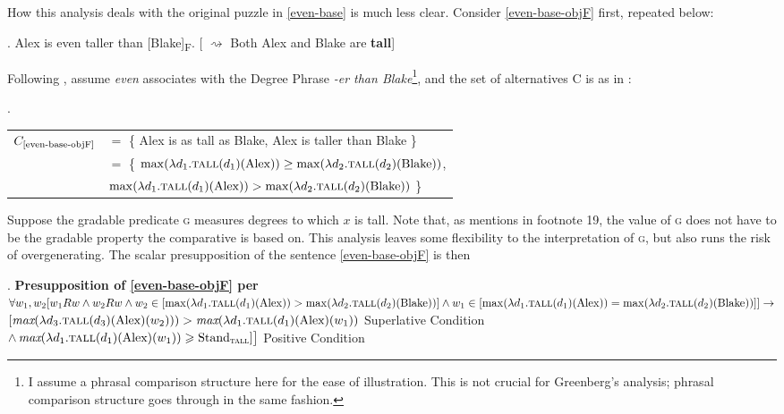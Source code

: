 \documentclass[12pt,letterpaper]{scrartcl}
\makeatletter
\newif\if@repeated\@repeatedfalse
\newcounter{savedExNo}
\newcommand{\exr}[1]{%
\@repeatedtrue
\setcounter{savedExNo}{\value{ExNo}}
\def\tmp@ref{#1}
\ex.}
\newcommand{\alignright}{\hspace*{\fill}}
\newcommand{\infer}{$\rightsquigarrow$ }
\makeatother
\begin{document}
How this analysis deals with the original puzzle in \ref{even-base} is much less clear. Consider \ref{even-base-objF} first, repeated below:

\exr{even-base-objF} Alex is even taller than [Blake]\textsubscript{F}.  %
\alignright [ \infer Both Alex and Blake are \textbf{tall}]

Following \cite{greenberg_revised_2018}, assume \textit{even} associates with the Degree Phrase \textit{-er than Blake}\footnote{I assume a phrasal comparison structure here for the ease of illustration. This is not crucial for Greenberg's analysis; phrasal comparison structure goes through in the same fashion.}, and the set of alternatives C is as in \Next:

\ex. \begin{tabular}[t]{rl}
    $C_{\text{\ref{even-base-objF}}}$ & $=$ \{ Alex is as tall as Blake, Alex is taller than Blake \}\\
    & $=$ \{ $\max(\lambda d_1.\textsc{tall}(d_1)(\text{Alex})) \geq \max(\lambda d_2.\textsc{tall}(d_2)(\text{Blake}))$, \\
    & $\max(\lambda d_1.\textsc{tall}(d_1)(\text{Alex})) > \max(\lambda d_2.\textsc{tall}(d_2)(\text{Blake}))$ \}
\end{tabular}

Suppose the gradable predicate \textsc{g} measures degrees to which $x$ is tall. Note that, as \cite{greenberg_revised_2018} mentions in footnote 19, the value of \textsc{g} does not have to be the gradable property the comparative is based on. This analysis leaves some flexibility to the interpretation of \textsc{g}, but also runs the risk of overgenerating. The scalar presupposition of the sentence \ref{even-base-objF} is then

\ex. \textbf{Presupposition of \ref{even-base-objF} per \cite{greenberg_revised_2018}}\\ 
    $\forall w_1, w_2 [w_1Rw \land w_2Rw \land w_2 \in [\max(\lambda d_1.\textsc{tall}(d_1)(\text{Alex})) > \max(\lambda d_2.\textsc{tall}(d_2)(\text{Blake}))]  \land w_1 \in [\max(\lambda d_1.\textsc{tall}(d_1)(\text{Alex})) = \max(\lambda d_2.\textsc{tall}(d_2)(\text{Blake}))]] \rightarrow$ \\
    $[\textit{max}(\lambda d_3.\textsc{tall}(d_3)(\text{Alex})(w_2))) > \textit{max}(\lambda d_1.\textsc{tall}(d_1)(\text{Alex})(w_1))$ \hspace*{\fill} Superlative Condition\\ 
    $\land \, \textit{max}(\lambda d_1.\textsc{tall}(d_1)(\text{Alex})(w_1)) \geqslant \text{Stand}_\textsc{tall} ] \big]$ \hspace*{\fill} Positive Condition
\end{document}
